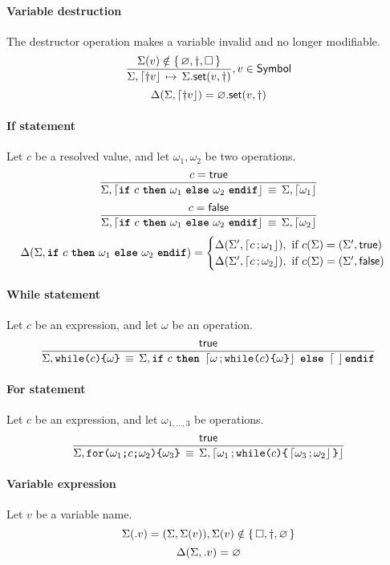 \paragraph{Variable destruction}
The destructor operation makes a variable invalid and no longer modifiable.
$$
\semrule
	{\Sigma(v) \notin \set{\varnothing, \dagger, \Box}}
	{\Sigma, \stmt{\dagger v}}
	{\StSet{\Sigma}{v}{\dagger}},
		v \in \Symbol
$$
$$
\Delta(\Sigma, \stmt{\dagger v}) = \StSet{\varnothing}{v}{\dagger}
$$


\paragraph{If statement}
Let $c$ be a resolved value, and let $\omega_1, \omega_2$ be two operations.
$$
\semruleeq
	{c = \true}
	{\Sigma, \stmt{\ifstmt{c}{\omega_1}{\omega_2}}}
	{\Sigma, \stmt{\omega_1}}
$$
$$
\semruleeq
	{c = \false}
	{\Sigma, \stmt{\ifstmt{c}{\omega_1}{\omega_2}}}
	{\Sigma, \stmt{\omega_2}}
$$
$$
\Delta(\Sigma, \ifstmt{c}{\omega_1}{\omega_2}) =
\begin{cases}
  \Delta(\Sigma', \stmt{c}{\omega_1}), ~ \text{if } c(\Sigma) = (\Sigma', \true)\\
  \Delta(\Sigma', \stmt{c}{\omega_2}), ~ \text{if } c(\Sigma) = (\Sigma', \false)
\end{cases}
$$

\paragraph{While statement}
Let $c$ be an expression, and let $\omega$ be an operation.
$$
\semruleeq
       {\true}
       {\Sigma, \whilestmt{c}{\omega}}
       {\Sigma, \ifstmt{c}{\stmt{\omega}{\whilestmt{c}{\omega}}}{\stmt}}
$$

\paragraph{For statement}
Let $c$ be an expression, and let $\omega_{1,\ldots,3}$ be operations.
$$
\semruleeq
        {\true}
        {\Sigma, \forstmt{\omega_1}{c}{\omega_2}{\omega_3}}
        {\Sigma, \stmt{\omega_1}{\whilestmt{c}{\stmt{\omega_3}{\omega_2}}}}
$$

\paragraph{Variable expression}
Let $v$ be a variable name.
$$
\Sigma({.}v) = (\Sigma, \Sigma(v)),
	\Sigma(v) \notin \left\{\,\Box, \dagger, \varnothing\,\right\}
$$
$$
\Delta(\Sigma, {.}v) = \varnothing
$$

